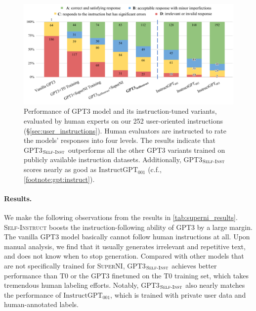 \documentclass[11pt]{article}
\newcommand{\daniel}[1]{\textcolor{blue}{[DK: #1]}}
\newcommand{\nascomment}[1]{\textcolor{blue}{\textbf{[#1 -- \textsc{nas}]}}}
\newcommand{\name}{\textsc{Self-Instruct}}
\newcommand{\supernatShort}{\textsc{SuperNI}}
\newcommand{\tzero}{\textsc{T$0$}}
\newcommand{\gptthree}{\textsc{GPT3}}
\newcommand{\gptself}{\textsc{GPT3}$_{\textsc{Self-Inst}}$}
\newcommand{\gptinstruct}[1]{$\text{InstructGPT}_{\text{#1}}$}
\begin{document}


\begin{figure}[t!]
    \centering
    \includegraphics[width=\textwidth, trim={0 20 0 10}]{figures/human_instruction_results.pdf}
    \caption{
    Performance of GPT3 model and its instruction-tuned variants, evaluated by human experts on our 252 user-oriented instructions (\S\ref{sec:user_instructions}). Human evaluators are instructed to rate the models' responses into four levels.
    The results indicate that \gptself{} outperforms 
    all the other \gptthree{} variants trained on publicly available instruction datasets. 
    Additionally, \gptself{} scores nearly as good as \gptinstruct{001} (c.f., \autoref{footnote:gpt:instruct}).
    }
    \label{fig:human_instructions_results}
\end{figure}

\paragraph{Results.}
We make the following observations from the results in \autoref{tab:superni_results}. 
\name{} 
boosts the instruction-following ability of \gptthree{} by a large margin. The vanilla \gptthree{} model basically cannot follow human instructions at all. Upon manual analysis, we find that it usually generates irrelevant and repetitive text, and does not know when to stop generation. 
Compared with other models that are not specifically trained for \supernatShort{}, \gptself{} achieves better performance than \tzero{} or the \gptthree{} finetuned on the \tzero{} training set, which takes tremendous human labeling efforts. Notably, \gptself{} also nearly matches the performance of \gptinstruct{001}, which is trained with private user data and human-annotated labels.
\end{document}
